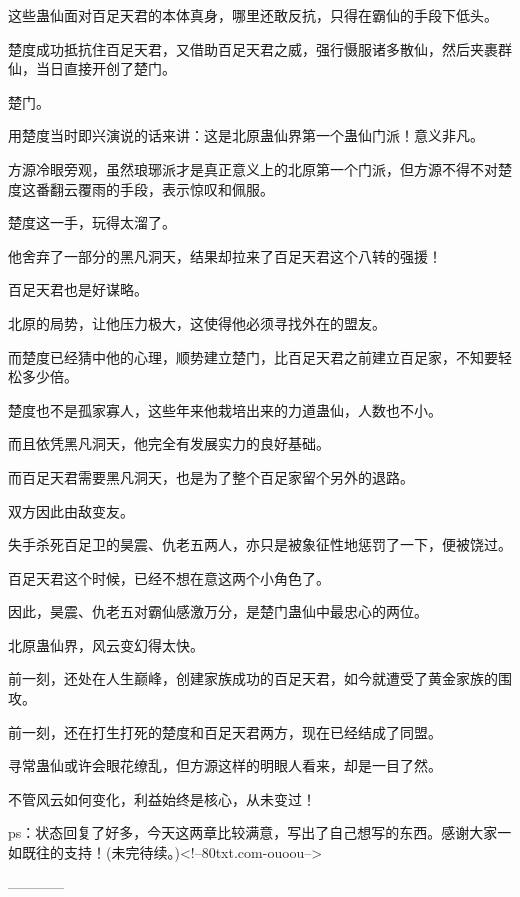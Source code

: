 \begin{this_body}
这些蛊仙面对百足天君的本体真身，哪里还敢反抗，只得在霸仙的手段下低头。

楚度成功抵抗住百足天君，又借助百足天君之威，强行慑服诸多散仙，然后夹裹群仙，当日直接开创了楚门。

楚门。

用楚度当时即兴演说的话来讲：这是北原蛊仙界第一个蛊仙门派！意义非凡。

方源冷眼旁观，虽然琅琊派才是真正意义上的北原第一个门派，但方源不得不对楚度这番翻云覆雨的手段，表示惊叹和佩服。

楚度这一手，玩得太溜了。

他舍弃了一部分的黑凡洞天，结果却拉来了百足天君这个八转的强援！

百足天君也是好谋略。

北原的局势，让他压力极大，这使得他必须寻找外在的盟友。

而楚度已经猜中他的心理，顺势建立楚门，比百足天君之前建立百足家，不知要轻松多少倍。

楚度也不是孤家寡人，这些年来他栽培出来的力道蛊仙，人数也不小。

而且依凭黑凡洞天，他完全有发展实力的良好基础。

而百足天君需要黑凡洞天，也是为了整个百足家留个另外的退路。

双方因此由敌变友。

失手杀死百足卫的昊震、仇老五两人，亦只是被象征性地惩罚了一下，便被饶过。

百足天君这个时候，已经不想在意这两个小角色了。

因此，昊震、仇老五对霸仙感激万分，是楚门蛊仙中最忠心的两位。

北原蛊仙界，风云变幻得太快。

前一刻，还处在人生巅峰，创建家族成功的百足天君，如今就遭受了黄金家族的围攻。

前一刻，还在打生打死的楚度和百足天君两方，现在已经结成了同盟。

寻常蛊仙或许会眼花缭乱，但方源这样的明眼人看来，却是一目了然。

不管风云如何变化，利益始终是核心，从未变过！

ps：状态回复了好多，今天这两章比较满意，写出了自己想写的东西。感谢大家一如既往的支持！(未完待续。)<!--80txt.com-ouoou-->

------------

\end{this_body}

